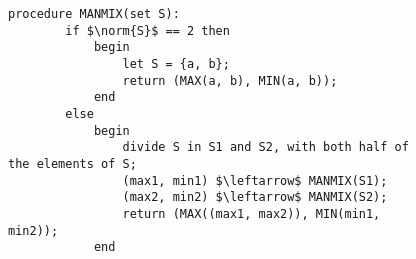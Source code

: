 \documentclass{subfiles}
\begin{document}
\begin{figure}[!h]
    \centering
    \begin{lstlisting}[language = algol]
    procedure MANMIX(set S):
        if $\norm{S}$ == 2 then
            begin
                let S = {a, b};
                return (MAX(a, b), MIN(a, b));
            end
        else
            begin
                divide S in S1 and S2, with both half of the elements of S;
                (max1, min1) $\leftarrow$ MANMIX(S1);
                (max2, min2) $\leftarrow$ MANMIX(S2);
                return (MAX((max1, max2)), MIN(min1, min2));
            end
\end{lstlisting}
\end{figure}
\end{document}
